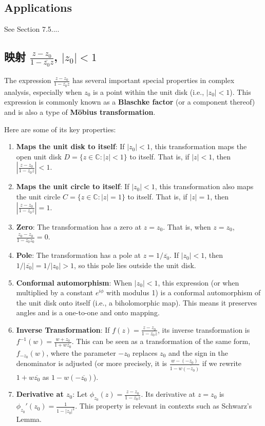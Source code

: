 \subsection{Applications}

See Section 7.5....

\subsection{映射 \texorpdfstring{$\frac{z-z_0}{1-\overline{z_0}z}$}{(z-z_0)/(1-overlinez_0z)}, \texorpdfstring{$\lvert z_0 \rvert<1$}{|z_0|<1}}

The expression $\frac{z-z_0}{1-\overline{z_0}z}$ has several important special properties in complex analysis, especially when $z_0$ is a point within the unit disk (i.e., $|z_0| < 1$). This expression is commonly known as a \textbf{Blaschke factor} (or a component thereof) and is also a type of \textbf{Möbius transformation}.

Here are some of its key properties:

\begin{enumerate}
	\item \textbf{Maps the unit disk to itself}: If $|z_0| < 1$, this transformation maps the open unit disk $D = \{z \in \mathbb{C} : |z| < 1\}$ to itself. That is, if $|z| < 1$, then $\left|\frac{z-z_0}{1-\overline{z_0}z}\right| < 1$.
	\item \textbf{Maps the unit circle to itself}: If $|z_0| < 1$, this transformation also maps the unit circle $C = \{z \in \mathbb{C} : |z| = 1\}$ to itself. That is, if $|z| = 1$, then $\left|\frac{z-z_0}{1-\overline{z_0}z}\right| = 1$.
	\item \textbf{Zero}: The transformation has a zero at $z = z_0$. That is, when $z = z_0$, $\frac{z_0-z_0}{1-\overline{z_0}z_0} = 0$.
	\item \textbf{Pole}: The transformation has a pole at $z = 1/\overline{z_0}$. If $|z_0| < 1$, then $1/|\overline{z_0}| = 1/|z_0| > 1$, so this pole lies outside the unit disk.
	\item \textbf{Conformal automorphism}: When $|z_0| < 1$, this expression (or when multiplied by a constant $e^{i\phi}$ with modulus 1) is a conformal automorphism of the unit disk onto itself (i.e., a biholomorphic map). This means it preserves angles and is a one-to-one and onto mapping.
	\item \textbf{Inverse Transformation}: If $f(z) = \frac{z-z_0}{1-\overline{z_0}z}$, its inverse transformation is $f^{-1}(w) = \frac{w+z_0}{1+w \overline{z_0}}$. This can be seen as a transformation of the same form, $f_{-z_0}(w)$, where the parameter $-z_0$ replaces $z_0$ and the sign in the denominator is adjusted (or more precisely, it is $\frac{w-(-z_0)}{1-w\overline{(-z_0)}}$ if we rewrite $1+w\overline{z_0}$ as $1-w(-\overline{z_0})$).
	\item \textbf{Derivative at $z_0$}: Let $\phi_{z_0}(z) = \frac{z-z_0}{1-\overline{z_0}z}$. Its derivative at $z=z_0$ is $\phi_{z_0}'(z_0) = \frac{1}{1-|z_0|^2}$. This property is relevant in contexts such as Schwarz's Lemma.
\end{enumerate}

